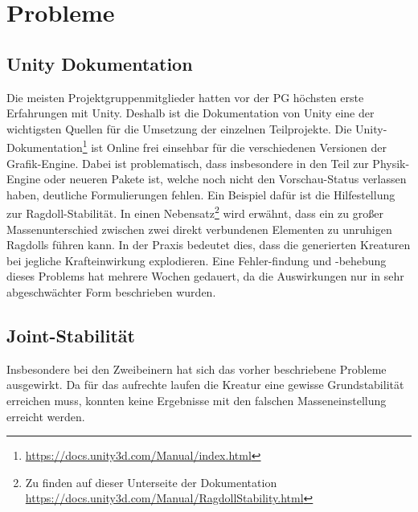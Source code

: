 \chapter{Probleme}
\label{Probleme}
\section{Unity Dokumentation} %
Die meisten Projektgruppenmitglieder hatten vor der PG höchsten erste Erfahrungen mit Unity. Deshalb ist die Dokumentation von Unity eine der wichtigsten Quellen für die Umsetzung der einzelnen Teilprojekte. Die Unity-Dokumentation\footnote{\url{https://docs.unity3d.com/Manual/index.html}} ist Online frei einsehbar für die verschiedenen Versionen der Grafik-Engine.
Dabei ist problematisch, dass insbesondere in den Teil zur Physik-Engine oder neueren Pakete ist, welche noch nicht den Vorschau-Status verlassen haben, deutliche Formulierungen fehlen. Ein Beispiel dafür ist die Hilfestellung zur Ragdoll-Stabilität. In einen Nebensatz\footnote{Zu finden auf dieser Unterseite der Dokumentation \url{https://docs.unity3d.com/Manual/RagdollStability.html}} wird erwähnt, dass ein zu großer Massenunterschied zwischen zwei direkt verbundenen Elementen zu unruhigen Ragdolls führen kann. In der Praxis bedeutet dies, dass die generierten Kreaturen bei jegliche Krafteinwirkung explodieren. Eine Fehler-findung und -behebung dieses Problems hat mehrere Wochen gedauert, da die Auswirkungen nur in sehr abgeschwächter Form beschrieben wurden.

\section{Joint-Stabilität}
Insbesondere bei den Zweibeinern hat sich das vorher beschriebene Probleme ausgewirkt. Da für das aufrechte laufen die Kreatur eine gewisse Grundstabilität erreichen muss, konnten keine Ergebnisse mit den falschen Masseneinstellung erreicht werden. 